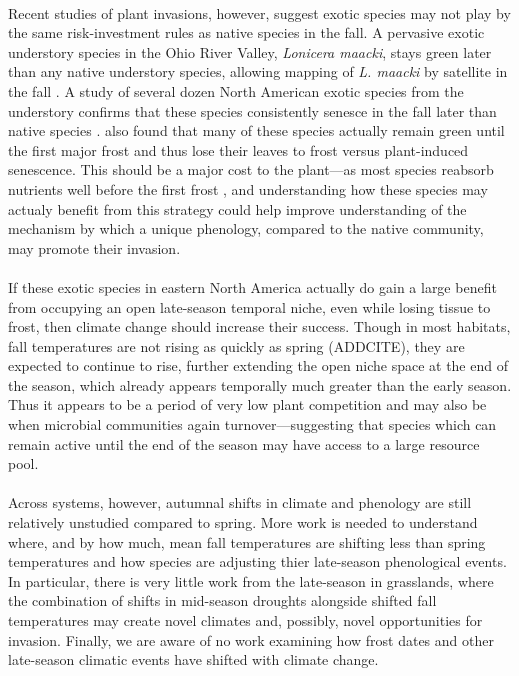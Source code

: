 \documentclass[11pt,a4paper,oneside]{article}
\begin{document}
\\
Recent studies of plant invasions, however, suggest exotic species may not play by the same risk-investment rules as native species in the fall. A pervasive exotic understory species in the Ohio River Valley, \emph{Lonicera maacki}, stays green later than any native understory species, allowing mapping of \emph{L. maacki} by satellite in the fall \citep{becker2013}. A study of several dozen North American exotic species from the understory confirms that these species consistently senesce in the fall later than native species \citep{Fridley:2012fj}. \citet{Fridley:2012fj} also found that many of these species actually remain green until the first major frost and thus lose their leaves to frost versus plant-induced senescence. This should be a major cost to the plant---as most species reabsorb nutrients well before the first frost \citep{Lambers:2008jb}, and understanding how these species may actualy benefit from this strategy could help improve understanding of the mechanism by which a unique phenology, compared to the native community, may promote their invasion.\\
\\
If these exotic species in eastern North America actually do gain a large benefit from occupying an open late-season temporal niche, even while losing tissue to frost, then climate change should increase their success. Though in most habitats, fall temperatures are not rising as quickly as spring (ADDCITE), they are expected to continue to rise, further extending the open niche space at the end of the season, which already appears temporally much greater than the early season. Thus it appears to be a period of very low plant competition and may also be when microbial communities again turnover---suggesting that species which can remain active until the end of the season may have access to a large resource pool. \\
\\
Across systems, however, autumnal shifts in climate and phenology are still relatively unstudied compared to spring. More work is needed to understand where, and by how much, mean fall temperatures are shifting less than spring temperatures and how species are adjusting thier late-season phenological events. In particular, there is very little work from the late-season in grasslands, where the combination of shifts in mid-season droughts alongside shifted fall temperatures may create novel climates and, possibly, novel opportunities for invasion. Finally, we are aware of no work examining how frost dates and other late-season climatic events have shifted with climate change. \\
\end{document}
